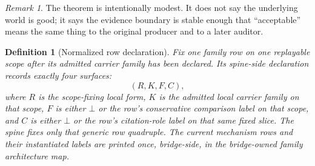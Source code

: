 \documentclass[11pt]{article}
\newtheorem{definition}{Definition}
\theoremstyle{remark}
\newtheorem{remark}{Remark}
\begin{document}
\begin{remark}
The theorem is intentionally modest. It does not say the underlying world is good; it says the evidence boundary is stable enough that
``acceptable'' means the same thing to the original producer and to a later auditor.
\end{remark}


\begin{definition}[Normalized row declaration]
Fix one family row on one replayable scope after its admitted carrier family has been declared.
Its spine-side declaration records exactly four surfaces:
\[
(R,K,F,C),
\]
where $R$ is the scope-fixing local form, $K$ is the admitted local carrier family on that scope, $F$ is either $\bot$ or the row's conservative comparison label on that scope, and $C$ is either $\bot$ or the row's citation-role label on that same fixed slice.
The spine fixes only that generic row quadruple.
The current mechanism rows and their instantiated labels are printed once, bridge-side, in the bridge-owned family architecture map.
\end{definition}
\end{document}
